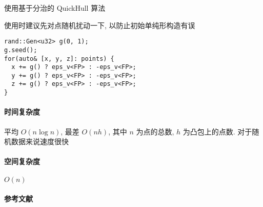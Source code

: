 使用基于分治的 QuickHull 算法

使用时建议先对点随机扰动一下, 以防止初始单纯形构造有误

\begin{verbatim}
rand::Gen<u32> g(0, 1);
g.seed();
for(auto& [x, y, z]: points) {
  x += g() ? eps_v<FP> : -eps_v<FP>;
  y += g() ? eps_v<FP> : -eps_v<FP>;
  z += g() ? eps_v<FP> : -eps_v<FP>;
}
\end{verbatim}

\paragraph{时间复杂度} 平均 \(O(n\log n)\), 最差 \(O(nh)\), 其中 \(n\) 为点的总数, \(h\) 为凸包上的点数. 对于随机数据来说速度很快

\paragraph{空间复杂度} \(O(n)\)

\paragraph{参考文献} \cite{barber1996quickhull}
